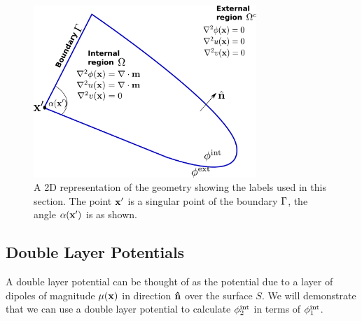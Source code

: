 \begin{figure}
  \center
  \includegraphics[width=0.75\textwidth]{./images/BEM-geometry}




  \caption{A 2D representation of the geometry showing the labels used in this section. The point $\mathbf{x}'$ is a singular point of the boundary ${\Gamma}$, the angle $\alpha(\mathbf{x}')$ is as shown.}
  \label{fig:BEM-geometry}
\end{figure}

\subsection{Double Layer Potentials}
\label{sec:double-layer-potent}
A double layer potential can be thought of as the potential due to a layer of dipoles of magnitude $\mu(\mathbf{x})$ in direction $\mathbf{\hat{n}}$ over the surface $S$.\cite{Sternberg1946} We will demonstrate that we can use a double layer potential to calculate $\phi^{\text{int}}_2$ in terms of $\phi^{\text{int}}_1$.

